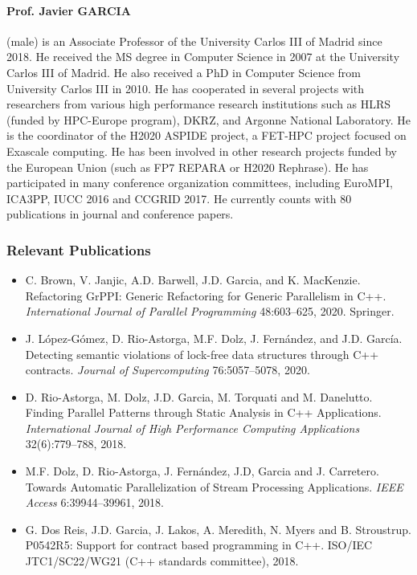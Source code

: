 \documentclass[a4paper,11pt]{article}
\begin{document}
\paragraph{Prof. Javier GARCIA} (male) is an Associate Professor of the University Carlos III of Madrid since 2018. He received the MS degree in Computer Science in 2007 at the University Carlos III of Madrid. He also received a PhD in Computer Science from University Carlos III in 2010. He has cooperated in several
projects with researchers from various high performance research institutions such as HLRS (funded by HPC-Europe program), DKRZ, and Argonne National Laboratory. 
He is the coordinator of the H2020 ASPIDE project, a FET-HPC project focused on Exascale computing. He has been involved in other research projects funded by the European Union (such as FP7 REPARA or H2020 Rephrase). He has participated in many conference organization committees, including EuroMPI, ICA3PP, IUCC 2016 and CCGRID 2017.
He currently counts with 80 publications in journal and conference papers.


\subsubsection*{Relevant Publications}

\begin{itemize}

\item
C. Brown, V. Janjic, A.D. Barwell, J.D. Garcia, and K. MacKenzie. 
Refactoring GrPPI: Generic Refactoring for Generic Parallelism in C++. 
\emph{International Journal of Parallel Programming} 48:603–625, 2020. Springer. 


\item 
J. López-Gómez, D. Rio-Astorga, M.F. Dolz, J. Fernández, and J.D. García. 
Detecting semantic violations of lock-free data structures through C++ contracts.
\emph{Journal of Supercomputing} 76:5057–5078, 2020. 

\item

D. Rio-Astorga, M. Dolz, J.D. Garcia, M. Torquati and M. Danelutto. 
Finding Parallel Patterns through Static Analysis in C++ Applications. 
\emph{International Journal of High Performance Computing Applications} 32(6):779–788, 2018. 

\item
M.F. Dolz, D. Rio-Astorga, J. Fernández, J.D, Garcia and J. Carretero.
Towards Automatic Parallelization of Stream Processing Applications.
\emph{IEEE Access} 6:39944–39961, 2018. 

\item
G. Dos Reis, J.D. Garcia, J. Lakos, A. Meredith, N. Myers and B. Stroustrup. 
P0542R5: Support for contract based programming in C++. 
ISO/IEC JTC1/SC22/WG21 (C++ standards committee), 2018.


\end{itemize}
\end{document}
